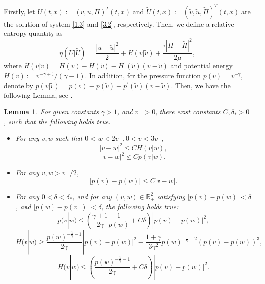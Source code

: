\documentclass[10pt,reqno]{amsart}
\numberwithin{equation}{section}
\newtheorem{lemma}[theorem]{Lemma}
\begin{document}
Firstly, let $U(t, x):=(v, u, \Pi)^T(t, x)$ and $\widetilde{U}(t, x):=(\widetilde{v}, \widetilde{u}, \widetilde{\Pi})^T(t, x)$ are the solution of system \eqref{1.3} and \eqref{3.2}, respectively. Then, we define a relative entropy quantity  as
\begin{equation}\label{4.2}
\eta(U|\widetilde{U})=\frac{|u-\widetilde{u}|^2}{2}+H(v|\widetilde{v})+\frac{\tau|\Pi-\widetilde{\Pi}|^2}{2\mu},
\end{equation}
where $H(v|\widetilde{v})=H(v)-H(\widetilde{v})-H^{\prime}(\widetilde{v})(v-\widetilde{v})$ and potential energy $H(v):=v^{-\gamma+1}/(\gamma-1)$. In addition, for the pressure function $p(v)=v^{-\gamma}$, denote by $p(v|\tilde v)=p(v)-p(\widetilde{v})-p^{\prime}(\widetilde{v})(v-\widetilde{v})$. Then, we have the following Lemma, see \cite{WY,SMJ}.
\begin{lemma}\label{le4.1}
For given constants $\gamma>1$, and $v_->0$, there exist constants $C,\delta_{\ast}>0$, such that the following holds true.
\begin{itemize}
\item[1)] For any $v,w$ such that $0<w<2v_-,0<v<3v_-$,
\[
|v-w|^2\leq CH(v|w),
\]
\[
|v-w|^2\leq Cp(v|w).
\]
\item[2)] For any $v,w>v_-/2$,
\[
|p(v)-p(w)|\leq C|v-w|.
\]
\item[3)] For any $0<\delta<\delta_{\ast}$, and for any $(v,w)\in \mathbb{R}^2_+$ satisfying $|p(v)-p(w)|<\delta$, and $|p(w)-p(v_-)|<\delta$, the following holds true:
\[
p(v|w)\leq\left(\frac{\gamma+1}{2\gamma}\frac{1}{p(w)}+C\delta\right)|p(v)-p(w)|^2,
\]
\[
H(v|w)\geq\frac{p(w)^{-\frac{1}{\gamma}-1}}{2\gamma}|p(v)-p(w)|^2-\frac{1+\gamma}{3\gamma^2}p(w)^{-\frac{1}{\gamma}-2}(p(v)-p(w))^3,
\]
\[
H(v|w)\leq\left(\frac{p(w)^{-\frac{1}{\gamma}-1}}{2\gamma}+C\delta\right)|p(v)-p(w)|^2.
\]

\end{itemize}
\end{lemma}
\end{document}
